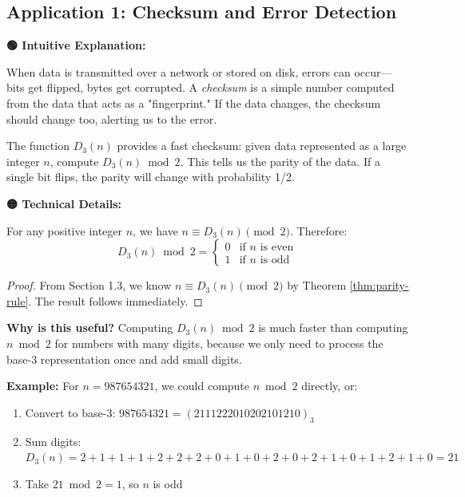 \subsection{Application 1: Checksum and Error Detection}

\textbf{🟢 Intuitive Explanation:}

When data is transmitted over a network or stored on disk, errors can occur—bits get flipped, bytes get corrupted. A \textit{checksum} is a simple number computed from the data that acts as a "fingerprint." If the data changes, the checksum should change too, alerting us to the error.

The function $D_3(n)$ provides a fast checksum: given data represented as a large integer $n$, compute $D_3(n) \bmod 2$. This tells us the parity of the data. If a single bit flips, the parity will change with probability 1/2.

\textbf{🟡 Technical Details:}

\begin{proposition}
\label{prop:parity-checksum}
For any positive integer $n$, we have $n \equiv D_3(n) \pmod{2}$. Therefore:
\begin{equation}
D_3(n) \bmod 2 = \begin{cases}
0 & \text{if } n \text{ is even} \\
1 & \text{if } n \text{ is odd}
\end{cases}
\end{equation}
\end{proposition}

\begin{proof}
From Section 1.3, we know $n \equiv D_3(n) \pmod{2}$ by Theorem \ref{thm:parity-rule}. The result follows immediately.
\end{proof}

\textbf{Why is this useful?} Computing $D_3(n) \bmod 2$ is much faster than computing $n \bmod 2$ for numbers with many digits, because we only need to process the base-3 representation once and add small digits.

\textbf{Example:} For $n = 987654321$, we could compute $n \bmod 2$ directly, or:
\begin{enumerate}
\item Convert to base-3: $987654321 = (2111222010202101210)_3$
\item Sum digits: $D_3(n) = 2+1+1+1+2+2+2+0+1+0+2+0+2+1+0+1+2+1+0 = 21$
\item Take $21 \bmod 2 = 1$, so $n$ is odd
\end{enumerate}

